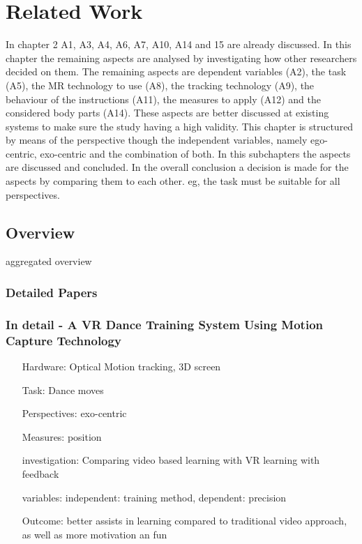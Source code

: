 \chapter{Related Work}
In chapter 2 A1, A3, A4, A6, A7, A10, A14 and 15 are already discussed. In this chapter the remaining aspects are analysed by investigating how other researchers decided on them. The remaining aspects are dependent variables (A2), the task (A5), the MR technology to use (A8), the tracking technology (A9), the behaviour of the instructions (A11), the measures to apply (A12) and the considered body parts (A14). These aspects are better discussed at existing systems to make sure the study having a high validity. This chapter is structured by means of the perspective though the independent variables, namely ego-centric, exo-centric and the combination of both. In this subchapters the aspects are discussed and concluded. In the overall conclusion a decision is made for the aspects by comparing them to each other. eg, the task must be suitable for all perspectives.

\section{Overview}
aggregated overview
\subsection{Detailed Papers}
\subsection{In detail - A VR Dance Training System Using Motion Capture Technology}
\begin{itemize}
	\item[Hardware:] Optical Motion tracking, 3D screen
	\item[Task:] Dance moves
	\item[Perspectives:] exo-centric
	\item[Measures:] position
	\item[investigation:] Comparing video based learning with VR learning with feedback
	\item[variables:] independent: training method, dependent: precision
	\item[Outcome:] better assists in learning compared to traditional video approach, as well as more motivation an fun
\end{itemize}

